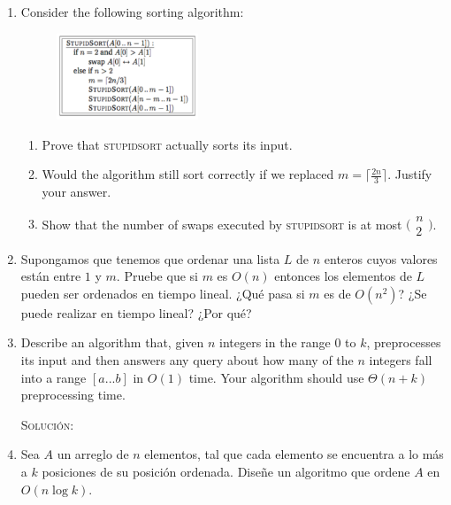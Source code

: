 \documentclass[letterpaper,11pt]{article}
\begin{document}
\begin{enumerate}
    \item Consider the following sorting algorithm:
    \begin{figure}[ht]
        \centering
        \includegraphics[width=0.4\textwidth]{./imagenes/stupidSort.png}
    \end{figure}

    \begin{enumerate}
        \item Prove that \textsc{stupidsort} actually sorts its input.

        \item Would the algorithm still sort correctly if we replaced 
        $m = \lceil \frac{2n}{3}\rceil$. Justify your answer.

        \item Show that the number of swaps executed by \textsc{stupidsort} is
        at most $\big(\begin{smallmatrix} n \\ 2 \end{smallmatrix}\big)$.
    \end{enumerate}

    \item Supongamos que tenemos que ordenar una lista $L$ de $n$ enteros cuyos
    valores están entre $1$ y $m$. Pruebe que si $m$ es $O(n)$ entonces los 
    elementos de $L$ pueden ser ordenados en tiempo lineal. ¿Qué pasa si $m$ es 
    de $O(n^2)$? ¿Se puede realizar en tiempo lineal? ¿Por qué?

    \item Describe an algorithm that, given $n$ integers in the range $0$ to 
    $k$, preprocesses its input and then answers any query about how many of 
    the $n$ integers fall into a range $[a ... b]$ in $O(1)$ time. Your 
    algorithm should use $\Theta(n + k)$ preprocessing time.

    \textsc{Solución:}

    \item Sea $A$ un arreglo de $n$ elementos, tal que cada elemento se 
    encuentra a lo más a $k$ posiciones de su posición ordenada. Diseñe un 
    algoritmo que ordene $A$ en $O(n \log k)$.


\end{enumerate}
\end{document}
